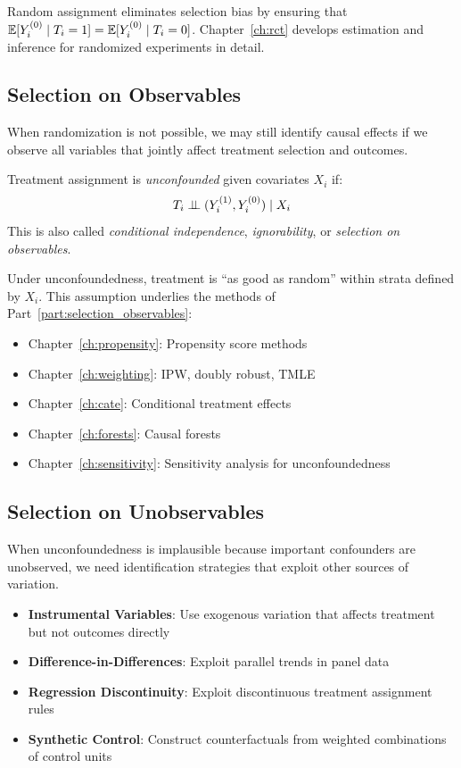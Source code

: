 Random assignment eliminates selection bias by ensuring that $\mathbb{E}[Y^{(0)}_i \mid T_i = 1] = \mathbb{E}[Y^{(0)}_i \mid T_i = 0]$. Chapter~\ref{ch:rct} develops estimation and inference for randomized experiments in detail.

\subsection{Selection on Observables}

When randomization is not possible, we may still identify causal effects if we observe all variables that jointly affect treatment selection and outcomes.

\begin{definition}[Unconfoundedness]
\label{def:unconfoundedness}
Treatment assignment is \emph{unconfounded} given covariates $X_i$ if:
\begin{equation}
T_i \perp\!\!\!\perp (Y^{(1)}_i, Y^{(0)}_i) \mid X_i
\label{eq:unconfoundedness}
\end{equation}
This is also called \emph{conditional independence}, \emph{ignorability}, or \emph{selection on observables}.
\end{definition}

Under unconfoundedness, treatment is ``as good as random'' within strata defined by $X_i$. This assumption underlies the methods of Part~\ref{part:selection_observables}:
\begin{itemize}
    \item Chapter~\ref{ch:propensity}: Propensity score methods
    \item Chapter~\ref{ch:weighting}: IPW, doubly robust, TMLE
    \item Chapter~\ref{ch:cate}: Conditional treatment effects
    \item Chapter~\ref{ch:forests}: Causal forests
    \item Chapter~\ref{ch:sensitivity}: Sensitivity analysis for unconfoundedness
\end{itemize}

\subsection{Selection on Unobservables}

When unconfoundedness is implausible because important confounders are unobserved, we need identification strategies that exploit other sources of variation.

\begin{itemize}
    \item \textbf{Instrumental Variables}: Use exogenous variation that affects treatment but not outcomes directly
    \item \textbf{Difference-in-Differences}: Exploit parallel trends in panel data
    \item \textbf{Regression Discontinuity}: Exploit discontinuous treatment assignment rules
    \item \textbf{Synthetic Control}: Construct counterfactuals from weighted combinations of control units
\end{itemize}

